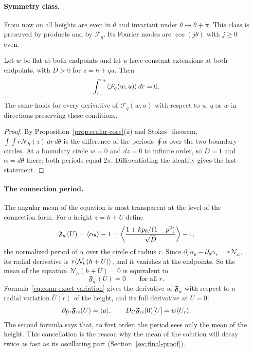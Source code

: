 \paragraph{Symmetry class.}
From now on all heights are even in $\theta$ and invariant under
$\theta\mapsto\theta+\pi$. This class is preserved by products and by
$\mathcal F_q$. Its Fourier modes are $\cos(j\theta)$ with $j\ge0$
even.

\begin{lemma}\label{lem:scalar-integral}
Let $w$ be flat at both endpoints and let $u$ have constant
extensions at both endpoints, with $D>0$ for $z=h+qu$. Then
\begin{equation}\label{eq:zero-total-integral}
 \int_{r_-}^{r_+}\langle \mathcal F_q(w,u)\rangle\,dr=0 .
\end{equation}
The same holds for every derivative of $\mathcal F_q(w,u)$ with
respect to $u$, $q$ or $w$ in directions preserving these conditions.
\end{lemma}

\begin{proof}
By Proposition~\ref{prop:scalar-core}(ii) and Stokes' theorem,
$\int\!\!\int r\mathcal N_h(z)\,dr\,d\theta$ is the difference of the
periods $\oint\alpha$ over the two boundary circles. At a boundary
circle $w=0$ and $dz=0$ to infinite order, so $D=1$ and
$\alpha=d\theta$ there: both periods equal $2\pi$. Differentiating the
identity gives the last statement.
\end{proof}

\paragraph{The connection period.}
The angular mean of the equation is most transparent at the level of
the connection form. For a height $z=h+U$ define
\begin{equation}\label{eq:cart-mean-path-flux}
 \mathfrak F_w(U)=\langle \alpha_\theta\rangle-1
 =\left\langle\frac{1+kp_\theta/(1-p^2)}{\sqrt D}\right\rangle-1,
\end{equation}
the normalized period of $\alpha$ over the circle of radius $r$. Since
$\partial_r\alpha_\theta-\partial_\theta\alpha_r=r\mathcal N_h$, its
radial derivative is $r\langle \mathcal N_h(h+U)\rangle$, and it vanishes at the
endpoints. So the mean of the equation $\mathcal N_h(h+U)=0$ is
equivalent to
\[
 \mathfrak F_w(U)=0\qquad\text{for all }r .
\]
Formula~\eqref{eq:conn-exact-variation} gives the derivative of
$\mathfrak F_w$ with respect to a radial variation $\bar U(r)$ of the
height, and its full derivative at $U=0$:
\begin{equation}\label{eq:mean-period-derivative}
 \partial_{\bar U'}\mathfrak F_w(U)=\langle a\rangle,
 \qquad D_U\mathfrak F_w(0)[U]=w\langle U_r\rangle.
\end{equation}
The second formula says that, to first order, the period sees only the
mean of the height. This cancellation is the reason why the mean of
the solution will decay twice as fast as its oscillating part
(Section~\ref{sec:final-proof}).

